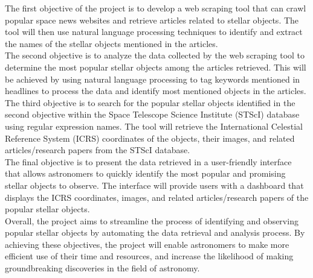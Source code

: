 \documentclass[12pt,letterpaper]{article}
\begin{document}
The first objective of the project is to develop a web scraping tool that can 
crawl popular space news websites and retrieve articles related to stellar objects. 
The tool will then use natural language processing techniques to identify and extract 
the names of the stellar objects mentioned in the articles.\\

The second objective is to analyze the data collected by the web scraping tool 
to determine the most popular stellar objects among the articles retrieved. This 
will be achieved by using natural language processing to tag keywords mentioned 
in headlines to process the data and identify most mentioned objects in the articles.\\

The third objective is to search for the popular stellar objects identified in 
the second objective within the Space Telescope Science Institute (STScI) database 
using regular expression names. The tool will retrieve the  International 
Celestial Reference System (ICRS) coordinates of the objects, their images, 
and related articles/research papers from the STScI database.\\

The final objective is to present the data retrieved in a user-friendly interface 
that allows astronomers to quickly identify the most popular and promising stellar 
objects to observe. The interface will provide users with a dashboard that displays 
the ICRS coordinates, images, and related articles/research papers of the popular 
stellar objects.\\

Overall, the project aims to streamline the process of identifying and observing 
popular stellar objects by automating the data retrieval and analysis process. 
By achieving these objectives, the project will enable astronomers to make more 
efficient use of their time and resources, and increase the likelihood of making 
groundbreaking discoveries in the field of astronomy.\\
\end{document}
